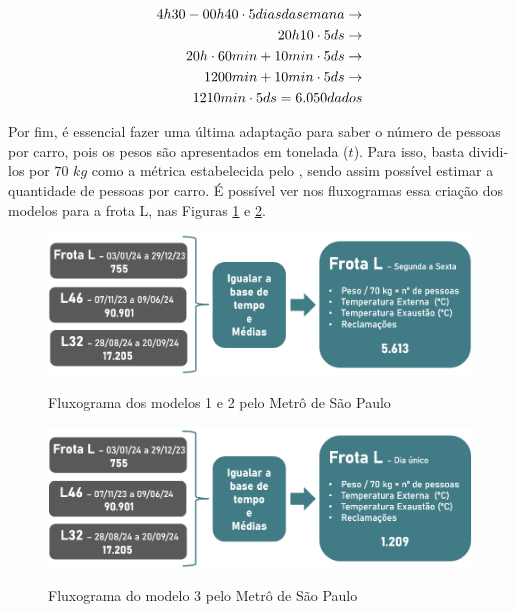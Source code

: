 \documentclass[acronym,symbols,table]{fei}
\begin{document}
\begin{equation} \label{eq:modelo1}
    \begin{aligned}
{4h30} - {00h40} \cdot {5 \space dias \space da \space semana} \rightarrow \\ {20h10} \cdot {5ds} \rightarrow \\ {20h} \cdot {60min} + {10min} \cdot {5ds} \rightarrow \\ {1200min} + {10min} \cdot {5ds} \rightarrow \\ {1210min} \cdot {5ds}  = {6.050\space dados}
    \end{aligned}
\end{equation}

Por fim, é essencial fazer uma última adaptação para saber o número de pessoas por carro, pois os pesos são apresentados em tonelada ($t$). Para isso, basta dividi-los por $70$ $kg$ como a métrica estabelecida pelo \textcite{metrosp2024}, sendo assim possível estimar a quantidade de pessoas por carro. É possível ver nos fluxogramas essa criação dos modelos para a frota L, nas Figuras \ref{fig:Fluxograma_tratamento_dados_m1_m2} e \ref{fig:Fluxograma_tratamento_dados_m3}.

\begin{figure}[!htb]
    \centering
    \caption{Fluxograma dos modelos 1 e 2 pelo Metrô de São Paulo}
    \includegraphics[width=0.8\linewidth]{Imagens/Fluxograma_criacao_modelos.png}
    \label{fig:Fluxograma_tratamento_dados_m1_m2}
\end{figure}

\begin{figure}[!htb]
    \centering
    \caption{Fluxograma do modelo 3 pelo Metrô de São Paulo}
    \includegraphics[width=0.8\linewidth]{Imagens/Fluxograma_dos_dados_modelo_3.png}
    \label{fig:Fluxograma_tratamento_dados_m3}
\end{figure}
\end{document}
